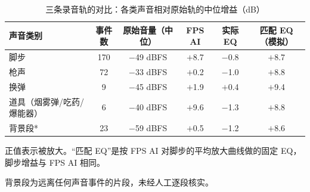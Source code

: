 \begin{table}[htbp]\centering
\caption{三条录音轨的对比：各类声音相对原始轨的中位增益（dB）}\label{tab:b_gain}
{\small\begin{threeparttable}
\begin{tabular}{lccccc}\toprule
声音类别 & 事件数 & 原始音量（中位） & FPS AI & 实际 EQ & 匹配 EQ（模拟） \\
\midrule
脚步 & 170 & $-$49 dBFS & $+$8.7 & $-$0.8 & $+$8.7 \\
枪声 & 72 & $-$33 dBFS & $+$0.2 & $-$1.0 & $+$8.8 \\
换弹 & 9 & $-$45 dBFS & $+$1.9 & $+$0.4 & $+$9.4 \\
道具（烟雾弹/吃药/爆能器） & 6 & $-$40 dBFS & $+$9.6 & $-$1.3 & $+$8.8 \\
背景段* & 23 & $-$59 dBFS & $+$0.5 & $-$1.2 & $+$8.6 \\
\bottomrule\end{tabular}
\begin{tablenotes}\footnotesize\item 正值表示被放大。“匹配 EQ”是按 FPS AI 对脚步的平均放大曲线做的固定 EQ，脚步增益与 FPS AI 相同。\item * 背景段为远离任何声音事件的片段，未经人工逐段核实。\end{tablenotes}\end{threeparttable}}
\end{table}

